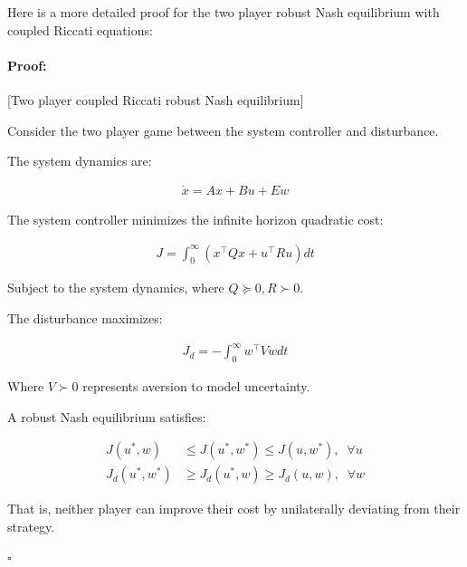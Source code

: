\documentclass[3p]{elsarticle}
\newenvironment{proof}{\paragraph{Proof:}}{\hfill$\square$}
\begin{document}




Here is a more detailed proof for the two player robust Nash equilibrium with coupled Riccati equations:

\begin{proof}[Two player coupled Riccati robust Nash equilibrium]

Consider the two player game between the system controller and disturbance. 

The system dynamics are:

\begin{align}
\dot{x} = Ax + Bu + Ew
\end{align}

The system controller minimizes the infinite horizon quadratic cost:

\begin{align} 
J = \int_0^\infty (x^\top Q x + u^\top R u) dt
\end{align}

Subject to the system dynamics, where $Q \succeq 0, R \succ 0$.

The disturbance maximizes:

\begin{align}
J_d = -\int_0^\infty w^\top V w dt
\end{align}

Where $V \succ 0$ represents aversion to model uncertainty. 

A robust Nash equilibrium satisfies:

\begin{align}
J(u^*, w) &\leq J(u^*, w^*) \leq J(u, w^*), \;\; \forall u \\
J_d(u^*, w^*) &\geq J_d(u^*, w) \geq J_d(u, w), \;\; \forall w
\end{align}

That is, neither player can improve their cost by unilaterally deviating from their strategy.


\end{proof}
\end{document}
